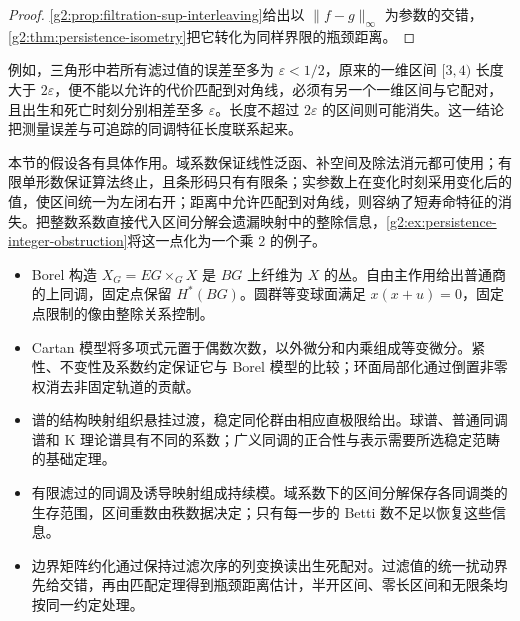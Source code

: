 \begin{proof}
	\cref{g2:prop:filtration-sup-interleaving}给出以 \(\|f-g\|_\infty\) 为参数的交错，\cref{g2:thm:persistence-isometry}把它转化为同样界限的瓶颈距离。
\end{proof}

例如，三角形中若所有滤过值的误差至多为 \(\varepsilon<1/2\)，原来的一维区间 \([3,4)\) 长度大于 \(2\varepsilon\)，便不能以允许的代价匹配到对角线，必须有另一个一维区间与它配对，且出生和死亡时刻分别相差至多 \(\varepsilon\)。长度不超过 \(2\varepsilon\) 的区间则可能消失。这一结论把测量误差与可追踪的同调特征长度联系起来。

\ProseParagraphBreak

本节的假设各有具体作用。域系数保证线性泛函、补空间及除法消元都可使用；有限单形数保证算法终止，且条形码只有有限条；实参数上在变化时刻采用变化后的值，使区间统一为左闭右开；距离中允许匹配到对角线，则容纳了短寿命特征的消失。把整数系数直接代入区间分解会遗漏映射中的整除信息，\cref{g2:ex:persistence-integer-obstruction}将这一点化为一个乘 \(2\) 的例子。

\begin{chaptersummary}
	\begin{itemize}
		\item Borel 构造 \(X_G=EG\times_GX\) 是 \(BG\) 上纤维为 \(X\) 的丛。自由主作用给出普通商的上同调，固定点保留 \(H^*(BG)\)。圆群等变球面满足 \(x(x+u)=0\)，固定点限制的像由整除关系控制。
		\item Cartan 模型将多项式元置于偶数次数，以外微分和内乘组成等变微分。紧性、不变性及系数约定保证它与 Borel 模型的比较；环面局部化通过倒置非零权消去非固定轨道的贡献。
		\item 谱的结构映射组织悬挂过渡，稳定同伦群由相应直极限给出。球谱、普通同调谱和 K 理论谱具有不同的系数；广义同调的正合性与表示需要所选稳定范畴的基础定理。
		\item 有限滤过的同调及诱导映射组成持续模。域系数下的区间分解保存各同调类的生存范围，区间重数由秩数据决定；只有每一步的 Betti 数不足以恢复这些信息。
		\item 边界矩阵约化通过保持过滤次序的列变换读出生死配对。过滤值的统一扰动界先给交错，再由匹配定理得到瓶颈距离估计，半开区间、零长区间和无限条均按同一约定处理。
	\end{itemize}
\end{chaptersummary}

\BookExercises

